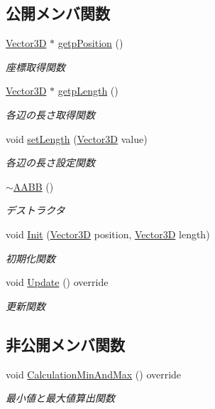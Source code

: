 \subsection*{公開メンバ関数}
\begin{DoxyCompactItemize}
\item 
\mbox{\hyperlink{class_vector3_d}{Vector3D}} $\ast$ \mbox{\hyperlink{class_a_a_b_b_a50913671231f729aff50dcc1f8c68daf}{getp\+Position}} ()
\begin{DoxyCompactList}\small\item\em 座標取得関数 \end{DoxyCompactList}\item 
\mbox{\hyperlink{class_vector3_d}{Vector3D}} $\ast$ \mbox{\hyperlink{class_a_a_b_b_ad86a852594d4a7833b74588937e0c55c}{getp\+Length}} ()
\begin{DoxyCompactList}\small\item\em 各辺の長さ取得関数 \end{DoxyCompactList}\item 
void \mbox{\hyperlink{class_a_a_b_b_a76816b1eb872408d91dfa6880e5af109}{set\+Length}} (\mbox{\hyperlink{class_vector3_d}{Vector3D}} value)
\begin{DoxyCompactList}\small\item\em 各辺の長さ設定関数 \end{DoxyCompactList}\item 
\mbox{\hyperlink{class_a_a_b_b_afd5f4956a2043597167ff66821f7b223}{$\sim$\+A\+A\+BB}} ()
\begin{DoxyCompactList}\small\item\em デストラクタ \end{DoxyCompactList}\item 
void \mbox{\hyperlink{class_a_a_b_b_a28167704c3b21de2ae9f70ac139781c4}{Init}} (\mbox{\hyperlink{class_vector3_d}{Vector3D}} position, \mbox{\hyperlink{class_vector3_d}{Vector3D}} length)
\begin{DoxyCompactList}\small\item\em 初期化関数 \end{DoxyCompactList}\item 
void \mbox{\hyperlink{class_a_a_b_b_a0a96be8dec3969d893bf90d3f05e22b7}{Update}} () override
\begin{DoxyCompactList}\small\item\em 更新関数 \end{DoxyCompactList}\end{DoxyCompactItemize}
\subsection*{非公開メンバ関数}
\begin{DoxyCompactItemize}
\item 
void \mbox{\hyperlink{class_a_a_b_b_a9f2f03e02053b4f170fc030bdc4ba6b6}{Calculation\+Min\+And\+Max}} () override
\begin{DoxyCompactList}\small\item\em 最小値と最大値算出関数 \end{DoxyCompactList}\end{DoxyCompactItemize}
